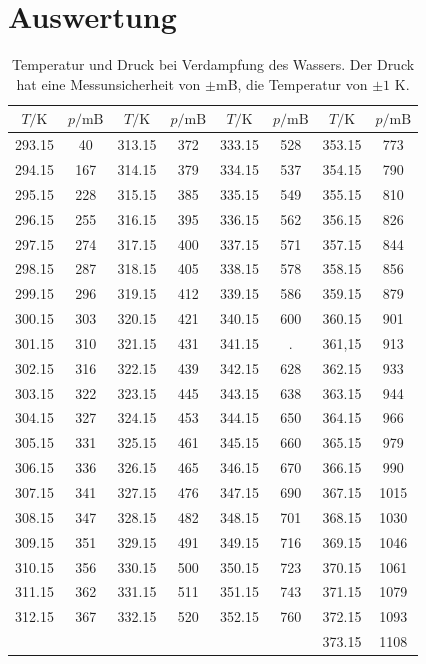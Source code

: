 \newpage
\section{Auswertung}
\label{sec:Auswertung}

\begin{table}[H]
  \centering
  \caption{Temperatur und Druck bei Verdampfung des Wassers. Der Druck hat eine Messunsicherheit von
  $\pm$mB, die Temperatur von $\pm 1$ K.}
  \label{tab:Messreihe_1}
\begin{tabular}{
  c c||c c||c c||c c
}
\toprule 
$T/ \unit{\kelvin}$ & $p / \text{mB}$ & $T/ \unit{\kelvin}$ & $p / \text{mB}$&
$T/ \unit{\kelvin}$ & $p / \text{mB}$ & $T/ \unit{\kelvin}$ & $p / \text{mB}$ \\
\midrule
293.15  & 40   & 313.15  & 372  & 333.15  & 528  & 353.15  & 773 \\
294.15  & 167  & 314.15  & 379  & 334.15  & 537  & 354.15  & 790 \\
295.15  & 228  & 315.15  & 385  & 335.15  & 549  & 355.15  & 810 \\
296.15  & 255  & 316.15  & 395  & 336.15  & 562  & 356.15  & 826 \\
297.15  & 274  & 317.15  & 400  & 337.15  & 571  & 357.15  & 844 \\
298.15  & 287  & 318.15  & 405  & 338.15  & 578  & 358.15  & 856 \\
299.15  & 296  & 319.15  & 412  & 339.15  & 586  & 359.15  & 879 \\
300.15  & 303  & 320.15  & 421  & 340.15  & 600  & 360.15  & 901 \\
301.15  & 310  & 321.15  & 431  & 341.15  & \text{--} .& 361,15  & 913 \\
302.15  & 316  & 322.15  & 439  & 342.15  & 628  & 362.15  & 933 \\
303.15  & 322  & 323.15  & 445  & 343.15  & 638  & 363.15  & 944 \\
304.15  & 327  & 324.15  & 453  & 344.15  & 650  & 364.15  & 966 \\
305.15  & 331  & 325.15  & 461  & 345.15  & 660  & 365.15  & 979 \\
306.15  & 336  & 326.15  & 465  & 346.15  & 670  & 366.15  & 990 \\
307.15  & 341  & 327.15  & 476  & 347.15  & 690  & 367.15  & 1015\\
308.15  & 347  & 328.15  & 482  & 348.15  & 701  & 368.15  & 1030\\
309.15  & 351  & 329.15  & 491  & 349.15  & 716  & 369.15  & 1046\\
310.15  & 356  & 330.15  & 500  & 350.15  & 723  & 370.15  & 1061\\
311.15  & 362  & 331.15  & 511  & 351.15  & 743  & 371.15  & 1079\\
312.15  & 367  & 332.15  & 520  & 352.15  & 760  & 372.15  & 1093\\
      &   &       &       &       &      & 373.15  & 1108 \\
\bottomrule
\end{tabular}
\end{table}
